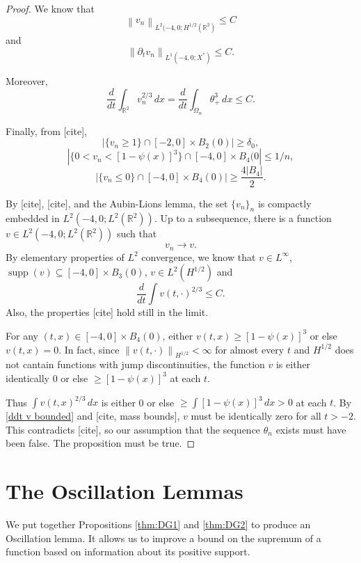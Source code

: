\documentclass[11pt]{amsart}
\theoremstyle{remark}
\theoremstyle{definition}
\newcommand{\R}{\mathbb{R}}
\newcommand{\norm}[1]{\left\lVert#1\right\rVert}
\newcommand{\abs}[1]{\left\lvert #1 \right\rvert}
\DeclareMathOperator{\supp}{supp}
\newcommand{\del}{\partial}
\newcommand{\ddt}{\frac{d}{dt}}
\begin{document}
\begin{proof}
We know that
\[ \norm{ v_n }_{L^2(-4,0; H^{1/2}(\R^2)} \leq C \]
and
\[ \norm{ \del_t v_n }_{L^1(-4,0; X^*)} \leq C. \]

Moreover, 
\[ \ddt \int_{\R^2} v_n^{2/3} \,dx = \ddt \int_{\Omega_n} \theta_+^3 \,dx \leq C. \]

Finally, from [cite],
\[ \abs{\{v_n \geq 1\} \cap [-2,0]\times B_2(0)} \geq \delta_0, \]
\[ \abs{\{0 < v_n < [1-\psi(x)]^3\} \cap [-4,0]\times B_4(0} \leq 1/n, \]
\[ \abs{\{v_n \leq 0\} \cap [-4,0]\times B_4(0)} \geq \frac{4 |B_4|}{2}. \]

By [cite], [cite], and the Aubin-Lions lemma, the set $\{v_n\}_n$ is compactly embedded in $L^2(-4,0; L^2(\R^2))$.  Up to a subsequence, there is a function $v \in L^2(-4,0; L^2(\R^2))$ such that
\[ v_n \to v. \]
By elementary properties of $L^2$ convergence, we know that $v \in L^\infty$, $\supp(v) \subseteq [-4,0]\times B_3(0)$, $v \in L^2(H^{1/2})$ and 
\begin{equation} \label{ddt v bounded} \ddt \int v(t,\cdot)^{2/3} \leq C. \end{equation} 
Also, the properties [cite] hold still in the limit.  

For any $(t,x) \in [-4,0]\times B_4(0)$, either $v(t,x) \geq [1 - \psi(x)]^3$ or else $v(t,x) = 0$.  In fact, since $\norm{v(t,\cdot)}_{H^{1/2}} < \infty$ for almost every $t$ and $H^{1/2}$ does not cantain functions with jump discontinuities, the function $v$ is either identically 0 or else $\geq [1-\psi(x)]^3$ at each $t$.  

Thus $\int v(t,x)^{2/3} \,dx$ is either 0 or else $\geq \int [1-\psi(x)]^3 \,dx > 0$ at each $t$.  By \eqref{ddt v bounded} and [cite, mass bounds], $v$ must be identically zero for all $t > -2$.  This contradicts [cite], so our assumption that the sequence $\theta_n$ exists must have been false.  The proposition must be true.  

\end{proof}



\section{The Oscillation Lemmas} \label{sec:harnack}

We put together Propositions \ref{thm:DG1} and \ref{thm:DG2} to produce an Oscillation lemma.  It allows us to improve a bound on the supremum of a function based on information about its positive support.  
\end{document}
